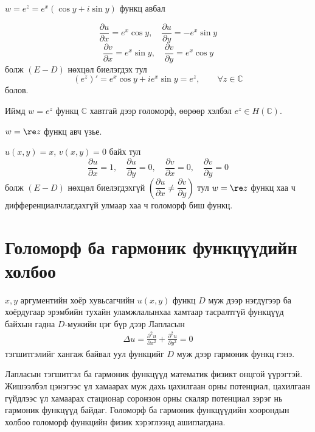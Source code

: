 \begin{exm}
 $w=e^z=e^x(\cos y +i\sin y)$ функц авбал 
\end{exm}
\begin{sol}
$$\frac{\partial u}{\partial x}=e^x\cos y, \quad \frac{\partial u}{\partial y}=-e^x\sin y $$
$$\frac{\partial v}{\partial x}=e^x\sin y, \quad \frac{\partial v}{\partial y}=e^x\cos y $$ болж $(E-D)$ нөхцөл биелэгдэх тул 
$$(e^z)'=e^x \cos y+ie^x\sin y= e^z, \qquad \forall z\in \mathbb{C}$$ болов.

Иймд $w=e^z$ функц $\mathbb{C}$ хавтгай дээр голоморф, өөрөөр хэлбэл $e^z\in H(\mathbb{C}).$ 
\end{sol}
\begin{exm}
 $w= \re z$ функц авч үзье.
\end{exm}
\begin{sol}
$u(x,y)=x$, $v(x,y)=0$ байх тул
$$\frac{\partial u}{\partial x}=1, \quad \frac{\partial u}{\partial y}=0, \quad \frac{\partial v}{\partial x}=0, \quad \frac{\partial v}{\partial y}=0$$
болж $(E-D)$ нөхцөл биелэгдэхгүй $\left(\dfrac{\partial u}{\partial x}\neq \dfrac{\partial v}{\partial y}\right)$ тул $w= \re z$ функц хаа ч дифференциалчлагдахгүй улмаар хаа ч голоморф биш функц. 
\end{sol}
\section{Голоморф ба гармоник функцүүдийн холбоо} 
$x,y$  аргументийн хоёр хувьсагчийн $u(x,y)$ функц $D$ муж дээр нэгдүгээр ба хоёрдугаар эрэмбийн тухайн уламжлалынхаа хамтаар тасралтгүй функцүүд байхын гадна $D$-мужийн цэг бүр дээр Лапласын
\begin{eqnarray} \label{3.11}
 \Delta u=\frac{\partial ^2u}{\partial x^2}+\frac{\partial ^2u}{\partial y^2}=0
\end{eqnarray}
тэгшитгэлийг  хангаж байвал уул функцийг $D$ муж дээр гармоник функц  гэнэ.

Лапласын тэгшитгэл ба гармоник функцүүд математик физикт онцгой үүрэгтэй. Жишээлбэл цэнэгээс үл хамаарах муж дахь цахилгаан орны потенциал, цахилгаан гүйдлээс үл хамаарах стационар соронзон орны скаляр потенциал зэрэг нь гармоник функцүүд байдаг. Голоморф ба гармоник функцүүдийн хоорондын холбоо голоморф функцийн физик хэрэглээнд ашиглагдана.

